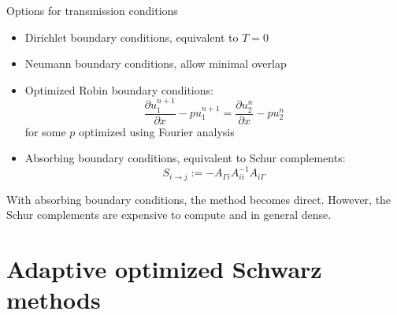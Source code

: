 \documentclass{beamer}
\begin{document}
\begin{frame}{Options for transmission conditions}

\begin{itemize}
\item Dirichlet boundary conditions, equivalent to $T=0$
\item Neumann boundary conditions, allow minimal overlap
\item Optimized Robin boundary conditions:
\begin{equation*}
	\frac{\partial u_1^{n+1}}{\partial x} - p u_1^{n+1} = \frac{\partial u_2^{n}}{\partial x} - p u_2^{n}
\end{equation*}
for some $p$ optimized using Fourier analysis
\item Absorbing boundary conditions, equivalent to Schur complements:
\begin{equation*}
	S_{i \to j} := -A_{\Gamma i} A_{ii}^{-1} A_{i \Gamma}
\end{equation*}
\end{itemize}
With absorbing boundary conditions, the method becomes direct.
However, the Schur complements are expensive to compute and in general dense.

\end{frame}





\section{Adaptive optimized Schwarz methods} %
\end{document}
